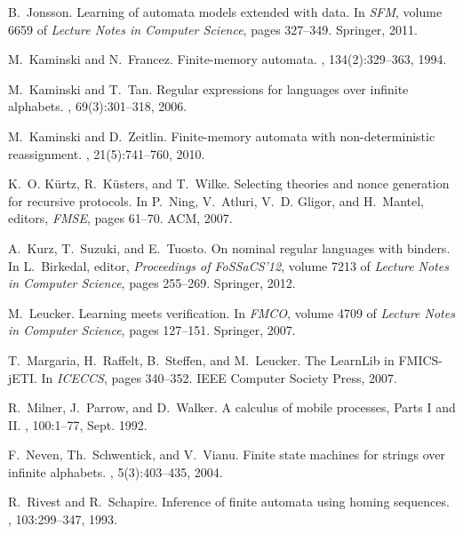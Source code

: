 \documentclass{LMCS}
\begin{document}
\begin{thebibliography}{10}
B.~Jonsson.
\newblock Learning of automata models extended with data.
\newblock In {\em SFM}, volume 6659 of {\em Lecture Notes in Computer Science},
  pages 327--349. Springer, 2011.

M.~Kaminski and N.~Francez.
\newblock Finite-memory automata.
, 134(2):329--363, 1994.

M.~Kaminski and T.~Tan.
\newblock Regular expressions for languages over infinite alphabets.
, 69(3):301--318, 2006.

M.~Kaminski and D.~Zeitlin.
\newblock Finite-memory automata with non-deterministic reassignment.
,
  21(5):741--760, 2010.

K.~O. K{\"u}rtz, R.~K{\"u}sters, and T.~Wilke.
\newblock Selecting theories and nonce generation for recursive protocols.
\newblock In P.~Ning, V.~Atluri, V.~D. Gligor, and H.~Mantel, editors, {\em
  FMSE}, pages 61--70. ACM, 2007.

A.~Kurz, T.~Suzuki, and E.~Tuosto.
\newblock On nominal regular languages with binders.
\newblock In L.~Birkedal, editor, {\em {P}roceedings of {FoSSaCS}'12}, volume
  7213 of {\em Lecture Notes in Computer Science}, pages 255--269. Springer,
  2012.

M.~Leucker.
\newblock Learning meets verification.
\newblock In {\em FMCO}, volume 4709 of {\em Lecture Notes in Computer
  Science}, pages 127--151. Springer, 2007.

T.~Margaria, H.~Raffelt, B.~Steffen, and M.~Leucker.
\newblock The {LearnLib} in {FMICS-jETI}.
\newblock In {\em ICECCS}, pages 340--352. IEEE Computer Society Press, 2007.

R.~Milner, J.~Parrow, and D.~Walker.
\newblock A calculus of mobile processes, {P}arts {I} and {II}.
, 100:1--77, Sept. 1992.

F.~Neven, {\relax Th}.~Schwentick, and V.~Vianu.
\newblock Finite state machines for strings over infinite alphabets.
, 5(3):403--435, 2004.

R.~Rivest and R.~Schapire.
\newblock Inference of finite automata using homing sequences.
, 103:299--347, 1993.


\end{thebibliography}
\end{document}
